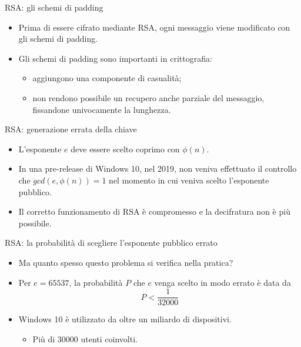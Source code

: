 \documentclass[11pt,svgnames,smaller,aspectratio=169,italian]{beamer}
\begin{document}
\begin{frame}{RSA: gli schemi di padding}
	\begin{itemize}
		\item Prima di essere cifrato mediante RSA, ogni messaggio viene modificato con gli schemi di padding.
		\item Gli schemi di padding sono importanti in crittografia:
			\begin{itemize}
				\item aggiungono una componente di casualità;
				\item non rendono possibile un recupero anche parziale del messaggio, fissandone univocamente la lunghezza.
			\end{itemize}
	\end{itemize}
\end{frame}

\begin{frame}{RSA: generazione errata della chiave}
	\begin{itemize}
		\item L'esponente $e$ deve essere scelto coprimo con $\phi(n)$.
		\item In una pre-release di Windows 10, nel 2019, non veniva effettuato il controllo che $gcd(e,\phi(n)) = 1$ nel momento in cui veniva scelto l'esponente pubblico.
		\item Il corretto funzionamento di RSA è compromesso e la decifratura non è più possibile.
	\end{itemize}
\end{frame}

\begin{frame}{RSA: la probabilità di scegliere l'esponente pubblico errato}
	\begin{itemize}
		\item Ma quanto spesso questo problema si verifica nella pratica?
		\item Per $e = 65537$, la probabilità $P$ che $e$ venga scelto in modo errato è data da
			\begin{equation*}
				P < \frac{1}{32000}
			\end{equation*}
		\item Windows 10 è utilizzato da oltre un miliardo di dispositivi.
			\begin{itemize}
				\item Più di 30000 utenti coinvolti.
			\end{itemize}
	\end{itemize}
\end{frame}
\end{document}
